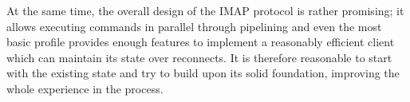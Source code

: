 \documentclass[trojita]{subfiles}
\begin{document}
At the same time, the overall design of the IMAP protocol is rather promising; it allows executing commands in
parallel through pipelining and even the most basic profile provides enough features to implement a reasonably efficient
client which can maintain its state over reconnects.  It is therefore reasonable to start with the existing state and
try to build upon its solid foundation, improving the whole experience in the process.
\end{document}
